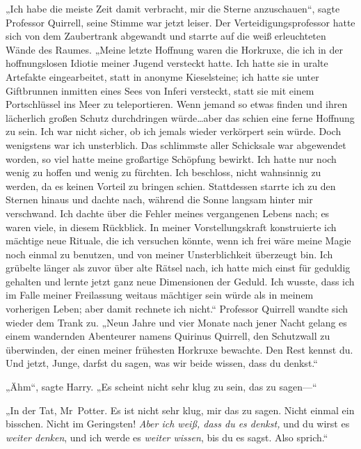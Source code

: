 „Ich habe die meiste Zeit damit verbracht, mir die Sterne anzuschauen“, sagte Professor Quirrell, seine Stimme war jetzt leiser. Der Verteidigungsprofessor hatte sich von dem Zaubertrank abgewandt und starrte auf die weiß erleuchteten Wände des Raumes. „Meine letzte Hoffnung waren die Horkruxe, die ich in der hoffnungslosen Idiotie meiner Jugend versteckt hatte. Ich hatte sie in uralte Artefakte eingearbeitet, statt in anonyme Kieselsteine; ich hatte sie unter Giftbrunnen inmitten eines Sees von Inferi versteckt, statt sie mit einem Portschlüssel ins Meer zu teleportieren. Wenn jemand so etwas finden und ihren lächerlich großen Schutz durchdringen würde…aber das schien eine ferne Hoffnung zu sein. Ich war nicht sicher, ob ich jemals wieder verkörpert sein würde. Doch wenigstens war ich unsterblich. Das schlimmste aller Schicksale war abgewendet worden, so viel hatte meine großartige Schöpfung bewirkt. Ich hatte nur noch wenig zu hoffen und wenig zu fürchten. Ich beschloss, nicht wahnsinnig zu werden, da es keinen Vorteil zu bringen schien. Stattdessen starrte ich zu den Sternen hinaus und dachte nach, während die Sonne langsam hinter mir verschwand. Ich dachte über die Fehler meines vergangenen Lebens nach; es waren viele, in diesem Rückblick. In meiner Vorstellungskraft konstruierte ich mächtige neue Rituale, die ich versuchen könnte, wenn ich frei wäre meine Magie noch einmal zu benutzen, und von meiner Unsterblichkeit überzeugt bin. Ich grübelte länger als zuvor über alte Rätsel nach, ich hatte mich einst für geduldig gehalten und lernte jetzt ganz neue Dimensionen der Geduld. Ich wusste, dass ich im Falle meiner Freilassung weitaus mächtiger sein würde als in meinem vorherigen Leben; aber damit rechnete ich nicht.“
Professor Quirrell wandte sich wieder dem Trank zu.
„Neun Jahre und vier Monate nach jener Nacht gelang es einem wandernden Abenteurer namens Quirinus Quirrell, den Schutzwall zu überwinden, der einen meiner frühesten Horkruxe bewachte. Den Rest kennst du. Und jetzt, Junge, darfst du sagen, was wir beide wissen, dass du denkst.“

„Ähm“, sagte Harry. „Es scheint nicht sehr klug zu sein, das zu sagen—“

„In der Tat, Mr~Potter. Es ist nicht sehr klug, mir das zu sagen. Nicht einmal ein bisschen. Nicht im Geringsten! \emph{Aber ich weiß, dass du es denkst,} und du wirst es \emph{weiter denken}, und ich werde es \emph{weiter wissen}, bis du es sagst. Also sprich.“

